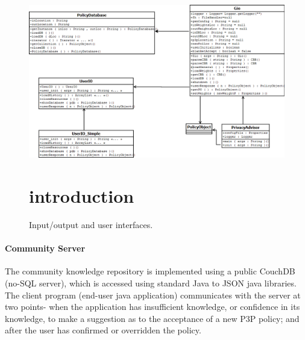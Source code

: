 
      



\begin{figure}[htbp]
\begin{center}
\includegraphics[width = \textwidth]{DesignReport/uml/gio.png}
\caption{Input/output and user interfaces.}
\part{introduction}
\label{UserIO}
\end{center}
\end{figure}





\subsection{Community Server}
The community knowledge repository is implemented using a public CouchDB (no-SQL server), which is accessed using standard Java to JSON java libraries. The client program (end-user java application) communicates with the server at two points- when the application has insufficient knowledge, or confidence in its knowledge, to make a suggestion as to the acceptance of a new P3P policy; and after the user has confirmed or overridden the policy.

